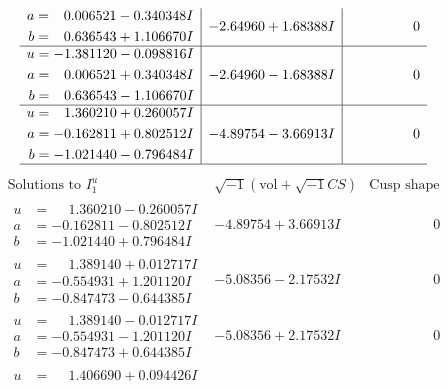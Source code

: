 \documentclass[1p]{elsarticle_modified}
\theoremstyle{definition}
\newcommand{\I}{\sqrt{-1}}
\begin{document}
$$\begin{array}{c|c|c}
\begin{aligned}
a &= \phantom{-}0.006521 - 0.340348 I \\
b &= \phantom{-}0.636543 + 1.106670 I\end{aligned}
 & -2.64960 + 1.68388 I & \phantom{-0.000000 } 0 \\ \hline\begin{aligned}
u &= -1.381120 - 0.098816 I \\
a &= \phantom{-}0.006521 + 0.340348 I \\
b &= \phantom{-}0.636543 - 1.106670 I\end{aligned}
 & -2.64960 - 1.68388 I & \phantom{-0.000000 } 0 \\ \hline\begin{aligned}
u &= \phantom{-}1.360210 + 0.260057 I \\
a &= -0.162811 + 0.802512 I \\
b &= -1.021440 - 0.796484 I\end{aligned}
 & -4.89754 - 3.66913 I & \phantom{-0.000000 } 0\\
 \hline 
 \end{array}$$\newpage$$\begin{array}{c|c|c}  
\text{Solutions to }I^u_{1}& \I (\text{vol} + \sqrt{-1}CS) & \text{Cusp shape}\\
 \hline 
\begin{aligned}
u &= \phantom{-}1.360210 - 0.260057 I \\
a &= -0.162811 - 0.802512 I \\
b &= -1.021440 + 0.796484 I\end{aligned}
 & -4.89754 + 3.66913 I & \phantom{-0.000000 } 0 \\ \hline\begin{aligned}
u &= \phantom{-}1.389140 + 0.012717 I \\
a &= -0.554931 + 1.201120 I \\
b &= -0.847473 - 0.644385 I\end{aligned}
 & -5.08356 - 2.17532 I & \phantom{-0.000000 } 0 \\ \hline\begin{aligned}
u &= \phantom{-}1.389140 - 0.012717 I \\
a &= -0.554931 - 1.201120 I \\
b &= -0.847473 + 0.644385 I\end{aligned}
 & -5.08356 + 2.17532 I & \phantom{-0.000000 } 0 \\ \hline\begin{aligned}
u &= \phantom{-}1.406690 + 0.094426 I \\

\end{aligned}
\end{array}$$
\end{document}
